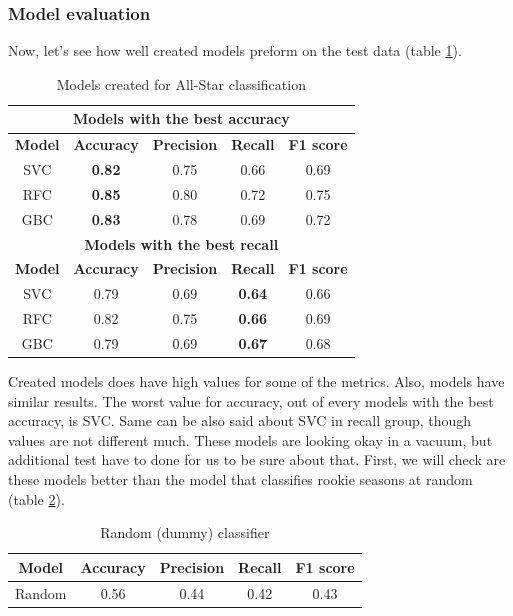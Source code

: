 \documentclass[a4paper]{article}
\begin{document}
\subsubsection{Model evaluation}
\label{subsubsec:model_eval_all_star}

Now, let's see how well created models preform on the test data (table \ref{tab:models_all_star}).

\begin{table}[!h]
\begin{center}
\begin{tabular}{|c|c|c|c|c|} \hline
\multicolumn{5}{|c|}{\textbf{Models with the best accuracy}} \\ \hline
\textbf{Model} & \textbf{Accuracy} & \textbf{Precision} & \textbf{Recall} & \textbf{F1 score} \\ \hline
SVC & \textbf{0.82} & 0.75 & 0.66 & 0.69 \\ \hline
RFC & \textbf{0.85} & 0.80 & 0.72 & 0.75 \\ \hline
GBC & \textbf{0.83} & 0.78 & 0.69 & 0.72 \\ \hline
\multicolumn{5}{|c|}{\textbf{Models with the best recall}} \\ \hline
\textbf{Model} & \textbf{Accuracy} & \textbf{Precision} & \textbf{Recall} & \textbf{F1 score} \\ \hline
SVC & 0.79 & 0.69 & \textbf{0.64} & 0.66 \\ \hline
RFC & 0.82 & 0.75 & \textbf{0.66} & 0.69 \\ \hline
GBC & 0.79 & 0.69 & \textbf{0.67} & 0.68 \\ \hline
\end{tabular}
\caption{Models created for All-Star classification}
\label{tab:models_all_star}
\end{center}
\end{table}

Created models does have high values for some of the metrics. Also, models have similar results. The worst value for accuracy, out of every models with the best accuracy, is SVC. Same can be also said about SVC in recall group, though values are not different much. These models are looking okay in a vacuum, but additional test have to done for us to be sure about that. First, we will check are these models better than the model that classifies rookie seasons at random (table \ref{tab:dummy_all_star}).

\begin{table}[!h]
\begin{center}
\begin{tabular}{|c|c|c|c|c|} \hline
\textbf{Model} & \textbf{Accuracy} & \textbf{Precision} & \textbf{Recall} & \textbf{F1 score} \\ \hline
Random & 0.56 & 0.44 & 0.42 & 0.43 \\ \hline
\end{tabular}
\caption{Random (dummy) classifier}
\label{tab:dummy_all_star}
\end{center}
\end{table}
\end{document}
